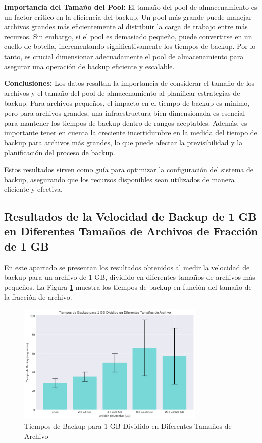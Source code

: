 \textbf{Importancia del Tamaño del Pool:}
El tamaño del pool de almacenamiento es un factor crítico en la eficiencia del backup. Un pool más grande puede manejar archivos grandes más eficientemente al distribuir la carga de trabajo entre más recursos. Sin embargo, si el pool es demasiado pequeño, puede convertirse en un cuello de botella, incrementando significativamente los tiempos de backup. Por lo tanto, es crucial dimensionar adecuadamente el pool de almacenamiento para asegurar una operación de backup eficiente y escalable.

\textbf{Conclusiones:}
Los datos resaltan la importancia de considerar el tamaño de los archivos y el tamaño del pool de almacenamiento al planificar estrategias de backup. Para archivos pequeños, el impacto en el tiempo de backup es mínimo, pero para archivos grandes, una infraestructura bien dimensionada es esencial para mantener los tiempos de backup dentro de rangos aceptables. Además, es importante tener en cuenta la creciente incertidumbre en la medida del tiempo de backup para archivos más grandes, lo que puede afectar la previsibilidad y la planificación del proceso de backup.

Estos resultados sirven como guía para optimizar la configuración del sistema de backup, asegurando que los recursos disponibles sean utilizados de manera eficiente y efectiva.



\subsection{Resultados de la Velocidad de Backup de 1 GB en Diferentes Tamaños de Archivos de Fracción de 1 GB}

En este apartado se presentan los resultados obtenidos al medir la velocidad de backup para un archivo de 1 GB, dividido en diferentes tamaños de archivos más pequeños. La Figura \ref{fig:backup-velocidad1gb} muestra los tiempos de backup en función del tamaño de la fracción de archivo.

\begin{figure}[H]
    \centering
    \includegraphics[width=0.8\textwidth]{backup_velocidad1gb.png}
    \caption{Tiempos de Backup para 1 GB Dividido en Diferentes Tamaños de Archivo}
    \label{fig:backup-velocidad1gb}
\end{figure}

